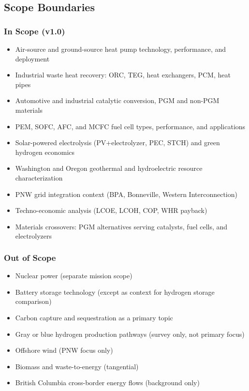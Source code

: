 \documentclass[11pt,letterpaper]{article}
\begin{document}
\subsection{Scope Boundaries}

\subsubsection{In Scope (v1.0)}
\begin{itemize}
  \item Air-source and ground-source heat pump technology, performance, and deployment
  \item Industrial waste heat recovery: ORC, TEG, heat exchangers, PCM, heat pipes
  \item Automotive and industrial catalytic conversion, PGM and non-PGM materials
  \item PEM, SOFC, AFC, and MCFC fuel cell types, performance, and applications
  \item Solar-powered electrolysis (PV+electrolyzer, PEC, STCH) and green hydrogen economics
  \item Washington and Oregon geothermal and hydroelectric resource characterization
  \item PNW grid integration context (BPA, Bonneville, Western Interconnection)
  \item Techno-economic analysis (LCOE, LCOH, COP, WHR payback)
  \item Materials crossovers: PGM alternatives serving catalysts, fuel cells, and electrolyzers
\end{itemize}

\subsubsection{Out of Scope}
\begin{itemize}
  \item Nuclear power (separate mission scope)
  \item Battery storage technology (except as context for hydrogen storage comparison)
  \item Carbon capture and sequestration as a primary topic
  \item Gray or blue hydrogen production pathways (survey only, not primary focus)
  \item Offshore wind (PNW focus only)
  \item Biomass and waste-to-energy (tangential)
  \item British Columbia cross-border energy flows (background only)
\end{itemize}
\end{document}
